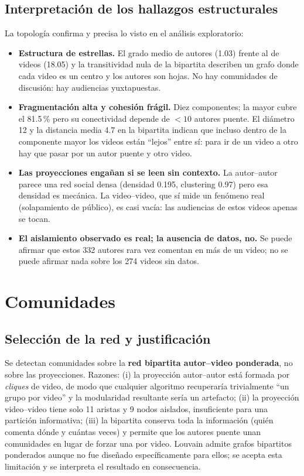\documentclass[11pt,a4paper]{article}
\begin{document}
\subsection{Interpretaci\'on de los hallazgos estructurales}
La topolog\'ia confirma y precisa lo visto en el an\'alisis exploratorio:
\begin{itemize}[leftmargin=1.4em,itemsep=2pt]
\item \textbf{Estructura de estrellas.} El grado medio de autores (1.03) frente al de videos (18.05)
y la transitividad nula de la bipartita describen un grafo donde cada video es un centro y los autores
son hojas. No hay comunidades de discusi\'on: hay audiencias yuxtapuestas.
\item \textbf{Fragmentaci\'on alta y cohesi\'on fr\'agil.} Diez componentes; la mayor cubre el 81.5\,\%
pero su conectividad depende de $<10$ autores puente. El di\'ametro 12 y la distancia media 4.7 en la
bipartita indican que incluso dentro de la componente mayor los videos est\'an ``lejos'' entre s\'i:
para ir de un video a otro hay que pasar por un autor puente y otro video.
\item \textbf{Las proyecciones enga\~nan si se leen sin contexto.} La autor--autor parece una red
social densa (densidad 0.195, clustering 0.97) pero esa densidad es mec\'anica. La video--video, que
s\'i mide un fen\'omeno real (solapamiento de p\'ublico), es casi vac\'ia: las audiencias de estos
videos apenas se tocan.
\item \textbf{El aislamiento observado es real; la ausencia de datos, no.} Se puede afirmar que estos
332 autores rara vez comentan en m\'as de un video; no se puede afirmar nada sobre los 274 videos sin
datos.
\end{itemize}

\section{Comunidades}

\subsection{Selecci\'on de la red y justificaci\'on}
Se detectan comunidades sobre la \textbf{red bipartita autor--video ponderada}, no sobre las
proyecciones. Razones: (i) la proyecci\'on autor--autor est\'a formada por \emph{cliques} de video, de
modo que cualquier algoritmo recuperar\'ia trivialmente ``un grupo por video'' y la modularidad
resultante ser\'ia un artefacto; (ii) la proyecci\'on video--video tiene solo 11 aristas y 9 nodos
aislados, insuficiente para una partici\'on informativa; (iii) la bipartita conserva toda la
informaci\'on (qui\'en comenta d\'onde y cu\'antas veces) y permite que los autores puente unan
comunidades en lugar de forzar una por video. Louvain admite grafos bipartitos ponderados aunque no
fue dise\~nado espec\'ificamente para ellos; se acepta esta limitaci\'on y se interpreta el resultado
en consecuencia.
\end{document}
